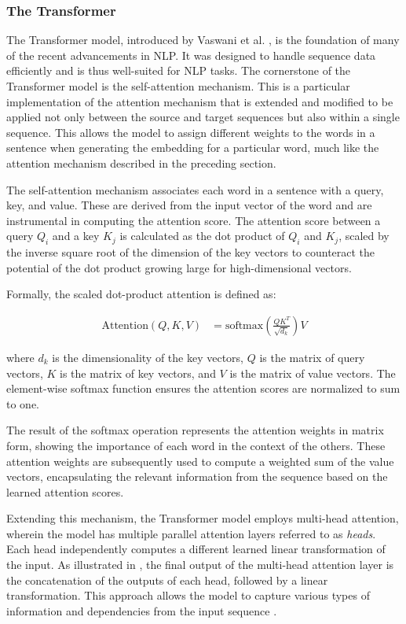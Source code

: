 \subsubsection*{The Transformer}

The Transformer model, introduced by Vaswani et al. \cite{VaswaniAttentionAll2017}, is the foundation of many of the recent advancements in \ac{NLP}. It was designed to handle sequence data efficiently and is thus well-suited for \ac{NLP} tasks. The cornerstone of the Transformer model is the self-attention mechanism. This is a particular implementation of the attention mechanism that is extended and modified to be applied not only between the source and target sequences but also within a single sequence. This allows the model to assign different weights to the words in a sentence when generating the embedding for a particular word, much like the attention mechanism described in the preceding section.

The self-attention mechanism associates each word in a sentence with a query, key, and value. These are derived from the input vector of the word and are instrumental in computing the attention score. The attention score between a query $Q_i$ and a key $K_j$ is calculated as the dot product of $Q_i$ and $K_j$, scaled by the inverse square root of the dimension of the key vectors to counteract the potential of the dot product growing large for high-dimensional vectors.

Formally, the scaled dot-product attention is defined as:

\begin{align}
    \text{Attention}(Q, K, V) & = \text{softmax}\left(\frac{QK^T}{\sqrt{d_k}}\right)V \label{eq:scaled-dot-product-attention}
\end{align}

where $d_k$ is the dimensionality of the key vectors, $Q$ is the matrix of query vectors, $K$ is the matrix of key vectors, and $V$ is the matrix of value vectors. The element-wise softmax function ensures the attention scores are normalized to sum to one.

The result of the softmax operation represents the attention weights in matrix form, showing the importance of each word in the context of the others. These attention weights are subsequently used to compute a weighted sum of the value vectors, encapsulating the relevant information from the sequence based on the learned attention scores.

Extending this mechanism, the Transformer model employs multi-head attention, wherein the model has multiple parallel attention layers referred to as \emph{heads}. Each head independently computes a different learned linear transformation of the input.
As illustrated in , the final output of the multi-head attention layer is the concatenation of the outputs of each head, followed by a linear transformation. This approach allows the model to capture various types of information and dependencies from the input sequence \cite{VigDeconstructingBERT2022a}.

